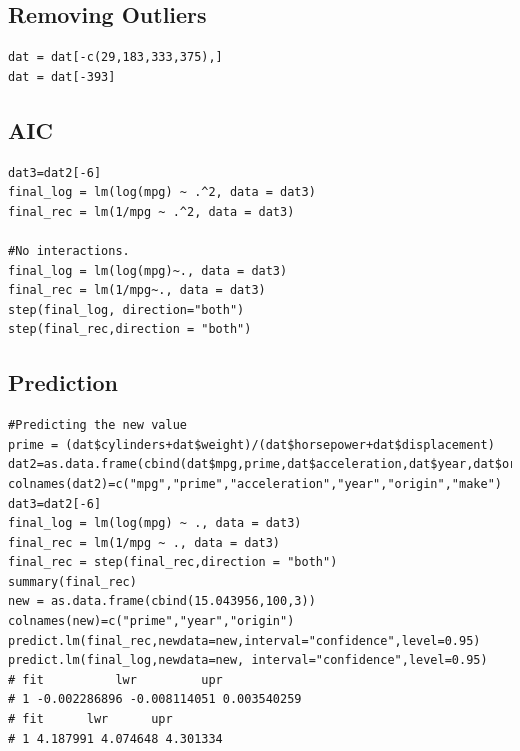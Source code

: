 \documentclass[11pt]{article} %
\begin{document}
\subsection{Removing Outliers}
\begin{lstlisting}
dat = dat[-c(29,183,333,375),]
dat = dat[-393]
\end{lstlisting}

\subsection{AIC}

\begin{lstlisting}
dat3=dat2[-6]
final_log = lm(log(mpg) ~ .^2, data = dat3)
final_rec = lm(1/mpg ~ .^2, data = dat3)

#No interactions.
final_log = lm(log(mpg)~., data = dat3)
final_rec = lm(1/mpg~., data = dat3)
step(final_log, direction="both")
step(final_rec,direction = "both")
\end{lstlisting}
\subsection{Prediction}
\begin{lstlisting}
#Predicting the new value
prime = (dat$cylinders+dat$weight)/(dat$horsepower+dat$displacement)
dat2=as.data.frame(cbind(dat$mpg,prime,dat$acceleration,dat$year,dat$origin,dat$make))
colnames(dat2)=c("mpg","prime","acceleration","year","origin","make")
dat3=dat2[-6]
final_log = lm(log(mpg) ~ ., data = dat3)
final_rec = lm(1/mpg ~ ., data = dat3)
final_rec = step(final_rec,direction = "both")
summary(final_rec)
new = as.data.frame(cbind(15.043956,100,3))
colnames(new)=c("prime","year","origin")
predict.lm(final_rec,newdata=new,interval="confidence",level=0.95)
predict.lm(final_log,newdata=new, interval="confidence",level=0.95)
# fit          lwr         upr
# 1 -0.002286896 -0.008114051 0.003540259
# fit      lwr      upr
# 1 4.187991 4.074648 4.301334
\end{lstlisting}
\end{document}

